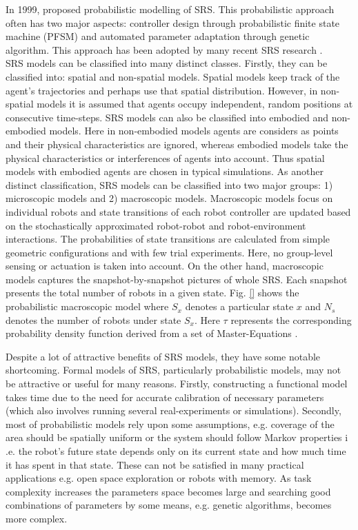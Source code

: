 In 1999,   proposed  probabilistic modelling of SRS.  This probabilistic approach often has two major aspects: controller design through probabilistic finite state machine (PFSM) and automated parameter adaptation through genetic algorithm. This approach has  been adopted by many recent SRS research . \\
SRS models can be classified into many distinct classes. Firstly, they can be classified into: spatial and non-spatial models. Spatial models keep track of the agent's trajectories and perhaps use that spatial distribution. However, in non-spatial models it is assumed that agents occupy independent, random positions at consecutive time-steps. SRS models can also be classified into embodied and non-embodied models. Here in non-embodied models agents are considers as points and their physical characteristics are ignored, whereas embodied models take the physical characteristics or interferences of agents into account. Thus spatial models with embodied agents are chosen in typical simulations. As another distinct classification, SRS models can be classified into two major groups: 1) microscopic models and 2) macroscopic models. Macroscopic models focus on individual robots and state transitions of each robot controller are updated based on the stochastically approximated robot-robot and robot-environment interactions. The probabilities of state transitions are calculated from  simple geometric configurations and with few trial experiments. Here, no group-level sensing or actuation is taken into account. On the other hand, macroscopic models captures the snapshot-by-snapshot pictures of whole SRS. Each snapshot presents the  total number of robots in a given state. Fig. \ref{} shows the probabilistic macroscopic model where $S_{x}$ denotes a particular state $x$ and $N_{s}$ denotes the number of robots under state $S_{x}$.  Here $\tau$ represents the corresponding probability density function derived from a set of Master-Equations \cite{Agassounon+2004}.

Despite a lot of attractive benefits of SRS models, they have some notable shortcoming. Formal models of SRS, particularly probabilistic models, may not be attractive or useful for many reasons.  Firstly, constructing a functional model takes time due to the need for accurate calibration of necessary parameters (which also involves running several real-experiments or simulations). 
Secondly, most of probabilistic models rely upon some assumptions, e.g. coverage of the area should be spatially uniform or the system should follow  Markov properties i .e. the robot's future state depends only on its current state and how much time it has spent in that state. These can not be satisfied in many practical applications e.g. open space exploration or robots with memory. As task complexity increases the parameters space becomes large and searching good combinations of parameters by some means, e.g. genetic algorithms, becomes more complex.

